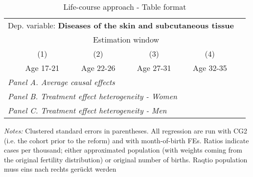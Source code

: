  \begin{table}[H] \centering \begin{threeparttable} \caption{Life-course approach - Table format} {\def\sym#1{\ifmmode^{#1}\else\(^{#1}\)\fi} \begin{tabular}{l*{5}{c}} \toprule \multicolumn{5}{l}{Dep. variable: \textbf{Diseases of the skin and subcutaneous tissue}} \\ & \multicolumn{4}{c}{Estimation window} \\ \cmidrule(lr){2-5}
            &\multicolumn{1}{c}{(1)}&\multicolumn{1}{c}{(2)}&\multicolumn{1}{c}{(3)}&\multicolumn{1}{c}{(4)}\\
            &\multicolumn{1}{c}{Age 17-21}&\multicolumn{1}{c}{Age 22-26}&\multicolumn{1}{c}{Age 27-31}&\multicolumn{1}{c}{Age 32-35}\\
\midrule
 \multicolumn{5}{l}{\emph{Panel A. Average causal effects}} \\      \midrule\multicolumn{5}{l}{\emph{Panel B. Treatment effect heterogeneity - Women}} \\      \midrule\multicolumn{5}{l}{\emph{Panel C. Treatment effect heterogeneity - Men}} \\      
\bottomrule \end{tabular} } \begin{tablenotes} \item \scriptsize \emph{Notes:} Clustered standard errors in parentheses. All regression are run with CG2 (i.e. the cohort prior to the reform) and with month-of-birth FEs. Ratios indicate cases per thousand; either approximated population (with weights coming from the original fertility distribution) or original number of births. Raqtio population muss eins nach rechts gerückt werden \end{tablenotes} \end{threeparttable} \end{table} 
